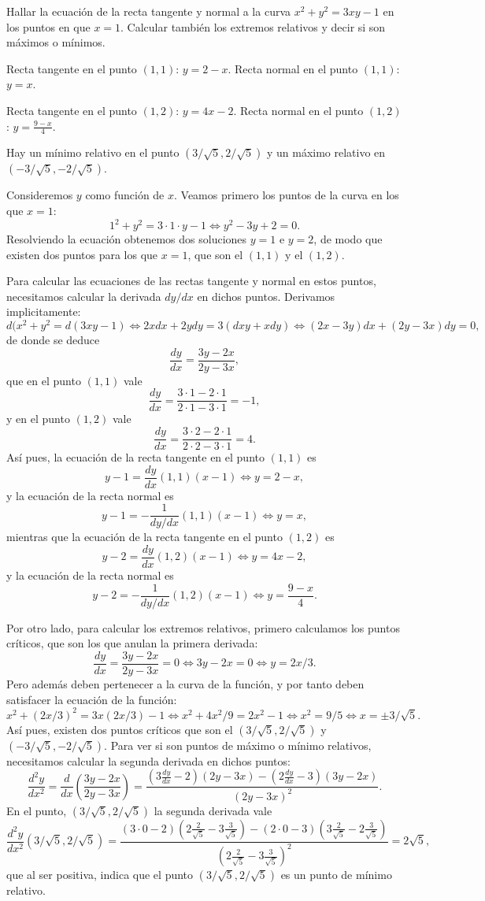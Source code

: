 {Hallar la ecuación de la recta tangente y normal a la curva $x^2+y^2=3xy-1$ en los puntos en que $x=1$. Calcular también los extremos relativos y decir si son máximos o mínimos.
}
{Recta tangente en el punto $(1,1)$: $y= 2-x$. Recta normal en el punto $(1,1)$: $y=x$.

Recta tangente en el punto $(1,2)$: $y= 4x-2$. Recta normal en el punto $(1,2)$: $y=\frac{9-x}{4}$.

Hay un mínimo relativo en el punto $(3/\sqrt{5},2/\sqrt{5})$ y un máximo relativo en $(-3/\sqrt{5},-2/\sqrt{5})$.
}
{Consideremos $y$ como función de $x$. Veamos primero los puntos de la curva en los que $x=1$:
\[
1^{2}+y^{2} = 3\cdot 1\cdot y-1 \Leftrightarrow y^{2} -3y+2 = 0.
\]
Resolviendo la ecuación obtenemos dos soluciones $y=1$ e $y=2$, de modo que existen dos puntos para los que $x=1$, que son el $(1,1)$ y el $(1,2)$.

Para calcular las ecuaciones de las rectas tangente y normal en estos puntos, necesitamos calcular la derivada $dy/dx$ en dichos puntos. Derivamos implicitamente:
\[
d(x^{2}+y^{2} = d(3xy-1) \Leftrightarrow 2xdx+2ydy = 3(dxy+xdy) \Leftrightarrow (2x-3y)dx+(2y-3x)dy = 0,
\]
de donde se deduce
\[
\frac{dy}{dx} = \frac{3y-2x}{2y-3x},
\]
que en el punto $(1,1)$ vale
\[
\frac{dy}{dx} = \frac{3\cdot 1 - 2\cdot 1}{2\cdot 1-3\cdot 1} = -1,
\]
y en el punto $(1,2)$ vale
\[
\frac{dy}{dx} = \frac{3\cdot 2 - 2\cdot 1}{2\cdot 2-3\cdot 1} = 4.
\]
Así pues, la ecuación de la recta tangente en el punto $(1,1)$ es
\[
y-1 = \frac{dy}{dx}(1,1)(x-1) \Leftrightarrow y= 2-x,
\]
y la ecuación de la recta normal es
\[
y-1 = -\frac{1}{dy/dx}(1,1)(x-1) \Leftrightarrow y= x,
\]
mientras que la ecuación de la recta tangente en el punto $(1,2)$ es \[
y-2 = \frac{dy}{dx}(1,2)(x-1) \Leftrightarrow y= 4x-2,
\]
y la ecuación de la recta normal es
\[
y-2 = -\frac{1}{dy/dx}(1,2)(x-1) \Leftrightarrow y=\frac{9-x}{4}.
\]

Por otro lado, para calcular los extremos relativos, primero calculamos los puntos críticos, que son los que anulan la primera derivada:
\[
\frac{dy}{dx}=\frac{3y-2x}{2y-3x}=0 \Leftrightarrow 3y-2x=0 \Leftrightarrow y=2x/3.
\]
Pero además deben pertenecer a la curva de la función, y por tanto deben satisfacer la ecuación de la función:
\[
x^{2}+(2x/3)^{2}=3x(2x/3)-1 \Leftrightarrow x^{2}+4x^{2}/9 = 2x^{2}-1 \Leftrightarrow x^{2}=9/5 \Leftrightarrow x=\pm 3/\sqrt{5}.
\]
Así pues, existen dos puntos críticos que son el $(3/\sqrt{5},2/\sqrt{5})$ y $(-3/\sqrt{5},-2/\sqrt{5})$. Para ver si son puntos de máximo o mínimo relativos, necesitamos calcular la segunda derivada en dichos puntos:
\[
\frac{d^{2}y}{dx^{2}}= \frac{d}{dx}\left(\frac{3y-2x}{2y-3x}\right) = \frac{(3\frac{dy}{dx}-2)(2y-3x)-(2\frac{dy}{dx}-3)(3y-2x)}{(2y-3x)^{2}}.
\]
En el punto, $(3/\sqrt{5},2/\sqrt{5})$ la segunda derivada vale
\[
\frac{d^{2}y}{dx^{2}}(3/\sqrt{5},2/\sqrt{5})=
\frac{(3\cdot 0-2)(2\frac{2}{\sqrt{5}}-3\frac{3}{\sqrt{5}})-(2\cdot 0-3)(3\frac{2}{\sqrt{5}}-2\frac{3}{\sqrt{5}})}{(2\frac{2}{\sqrt{5}}-3\frac{3}{\sqrt{5}})^{2}} = 2\sqrt{5},
\]
que al ser positiva, indica que el punto $(3/\sqrt{5},2/\sqrt{5})$ es un punto de mínimo relativo.

}

